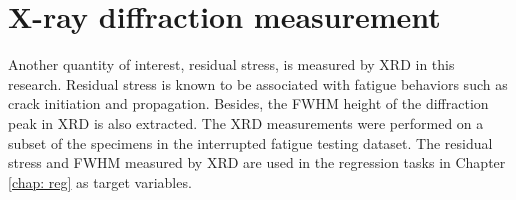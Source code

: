\section{X-ray diffraction measurement}
Another quantity of interest, residual stress, is measured by XRD in this research. Residual stress is known to be associated with fatigue behaviors such as crack initiation and propagation. Besides, the FWHM height of the diffraction peak in XRD is also extracted. The XRD measurements were performed on a subset of the specimens in the interrupted fatigue testing dataset. The residual stress and FWHM measured by XRD are used in the regression tasks in Chapter \ref{chap: reg} as target variables.

